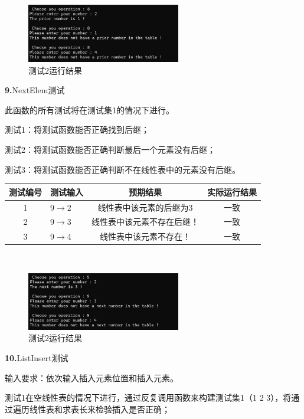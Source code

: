 \documentclass[supercite]{Experimental_Report}
\theoremstyle{definition}
\begin{document}
~\

 \begin{figure}[H]
 	\centering
 	\includegraphics[width=0.6\textwidth]{images/线性表测试8.png}
 	\caption{测试2运行结果}
 	\label{txlab}
 \end{figure}


\noindent\textbf{ 9.}NextElem测试

    此函数的所有测试将在测试集1的情况下进行。

    测试1：将测试函数能否正确找到后继；

    测试2：将测试函数能否正确判断最后一个元素没有后继；

    测试3：将测试函数能否正确判断不在线性表中的元素没有后继。

\vspace{0.5em}

\begin{tabular}{|c|l|c|c|}
	\hline
	测试编号 & 测试输入 & 预期结果 & 实际运行结果 \\
	\hline
	1 & 9$\rightarrow$2 & 线性表中该元素的后继为3 & 一致 \\
	\hline
	2 & 9$\rightarrow$3 & 线性表中该元素不存在后继！ & 一致 \\
	\hline
	3 & 9$\rightarrow$4 & 线性表中该元素不存在！ & 一致 \\
	\hline
\end{tabular}

~\

 \begin{figure}[H]
 	\centering
 	\includegraphics[width=0.6\textwidth]{images/线性表测试9.png}
 	\caption{测试2运行结果}
 	\label{txlab}
 \end{figure}


\noindent\textbf{10.}ListInsert测试

	输入要求：依次输入插入元素位置和插入元素。

	测试1在空线性表的情况下进行，通过反复调用函数来构建测试集1（1 2 3），将通过遍历线性表和求表长来检验插入是否正确；
\end{document}
